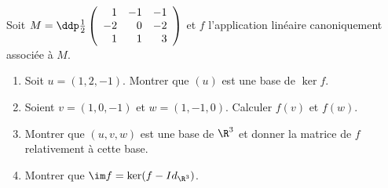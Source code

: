 \documentclass[a4paper, 11pt,reqno]{article}
\begin{document}
\begin{exercice}  \;
	Soit $M=\ddp\frac{1}{2}\left(\begin{array}{rrr} 1&-1&-1\\-2&0&-2\\1&1&3 \end{array}\right)$ et $f$ l'application lin\'eaire canoniquement associ\'ee \`a $M$.
	\begin{enumerate}
		\item Soit $u=(1,2,-1)$. Montrer que $(u)$ est une base de $\ker f$.
		\item Soient $v=(1,0,-1)$ et $w=(1,-1,0)$. Calculer $f(v)$ et $f(w)$.
		\item Montrer que $(u,v,w)$ est une base de $\R^3$ et donner la matrice de $f$ relativement \`a cette base.
		\item Montrer que $\im f=\ker (f-Id_{\R^3})$.
	\end{enumerate}
\end{exercice}
\end{document}
